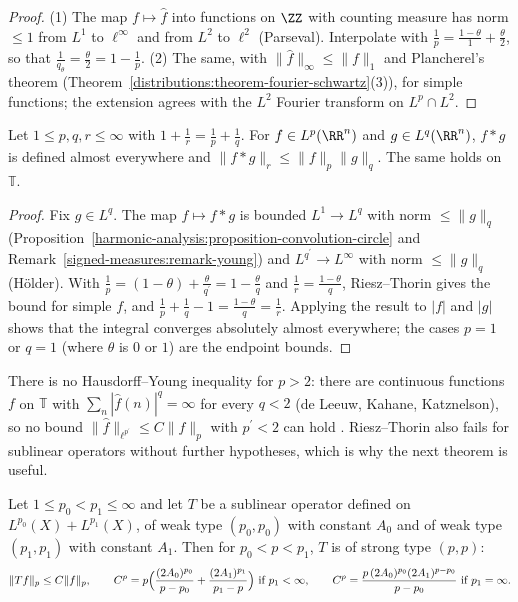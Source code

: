 \begin{proof}
(1) The map $f \mapsto \hat f$ into functions on $\ZZ$ with counting measure has norm $\leq 1$ from $L^1$ to $\ell^\infty$ and from $L^2$ to $\ell^2$ (Parseval). Interpolate with $\frac1p = \frac{1 - \theta}{1} + \frac\theta2$, so that
$\frac{1}{q_\theta} = \frac\theta2 = 1 - \frac1p$. (2) The same, with $\|\hat f\|_\infty \leq \|f\|_1$ and Plancherel's theorem (Theorem~\ref{distributions:theorem-fourier-schwartz}(3)), for simple functions; the
extension agrees with the $L^2$ Fourier transform on $L^p \cap L^2$.
\end{proof}

\begin{corollary}\label{harmonic-analysis:corollary-young}
Let $1 \leq p, q, r \leq \infty$ with $1 + \frac1r = \frac1p + \frac1q$. For $f \in L^p(\RR^n)$ and $g \in L^q(\RR^n)$, $f * g$ is defined almost everywhere and $\|f * g\|_r \leq \|f\|_p\|g\|_q$. The same holds on $\mathbb{T}$.
\end{corollary}

\begin{proof}
Fix $g \in L^q$. The map $f \mapsto f * g$ is bounded $L^1 \to L^q$ with norm $\leq \|g\|_q$ (Proposition~\ref{harmonic-analysis:proposition-convolution-circle} and Remark~\ref{signed-measures:remark-young}) and $L^{q^{\prime}} \to L^\infty$ with
norm $\leq \|g\|_q$ (H\"older). With $\frac1p = (1 - \theta) + \frac{\theta}{q^{\prime}} = 1 - \frac\theta q$ and $\frac1r = \frac{1 - \theta}{q}$, Riesz--Thorin gives the bound for simple $f$, and
$\frac1p + \frac1q - 1 = \frac{1 - \theta}{q} = \frac1r$. Applying the result to $|f|$ and $|g|$ shows that the integral converges absolutely almost everywhere; the cases $p = 1$ or $q = 1$ (where $\theta$ is $0$ or $1$) are
the endpoint bounds.
\end{proof}

\begin{counterexample}\label{harmonic-analysis:counterexample-hausdorff-young}
There is no Hausdorff--Young inequality for $p > 2$: there are continuous functions $f$ on $\mathbb{T}$ with $\sum_n|\hat f(n)|^{q} = \infty$ for every $q < 2$ (de Leeuw, Kahane, Katznelson), so no bound
$\|\hat f\|_{\ell^{p^{\prime}}} \leq C\|f\|_p$ with $p^{\prime} < 2$ can hold \cite{katznelson-harmonic}. Riesz--Thorin also fails for sublinear operators without further hypotheses, which is why the next theorem
is useful.
\end{counterexample}

\begin{theorem}[Marcinkiewicz]\label{harmonic-analysis:theorem-marcinkiewicz}
Let $1 \leq p_0 < p_1 \leq \infty$ and let $T$ be a sublinear operator defined on $L^{p_0}(X) + L^{p_1}(X)$, of weak type $(p_0, p_0)$ with constant $A_0$ and of weak type $(p_1, p_1)$ with constant $A_1$. Then for
$p_0 < p < p_1$, $T$ is of strong type $(p, p)$:
\[
\|Tf\|_p \leq C\|f\|_p, \qquad C^p = p\Bigl(\frac{(2A_0)^{p_0}}{p - p_0} + \frac{(2A_1)^{p_1}}{p_1 - p}\Bigr) \text{ if } p_1 < \infty, \qquad C^p = \frac{p\,(2A_0)^{p_0}(2A_1)^{p - p_0}}{p - p_0} \text{ if } p_1 = \infty.
\]
\end{theorem}

